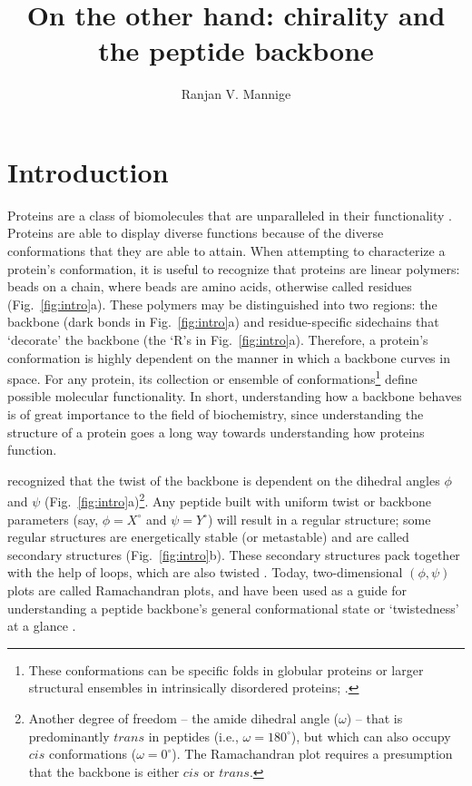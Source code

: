 \documentclass[fleqn,10pt]{wlpeerj} %
\title{On the other hand: chirality and the peptide backbone}
\author[1,*]{Ranjan V. Mannige}
\affil[1]{~Molecular Foundry, Lawrence Berkeley National Laboratory, Berkeley, CA, U.S.A.}
\affil[*]{~rvmannige@lbl.gov}
\newcommand{\Fig}[1]{Fig.~\ref{#1}}
\begin{document}
\flushbottom
\maketitle
\thispagestyle{empty}

\section*{Introduction}

Proteins are a class of biomolecules that are unparalleled in their functionality \citep{Berg2006}. 
Proteins are able to display diverse functions because of the diverse conformations that they are able to attain. 
When attempting to characterize a protein's conformation, it is useful to recognize that proteins are linear polymers:  beads on a chain, where beads are amino acids, otherwise called residues (\Fig{fig:intro}a). These polymers may be distinguished into two regions: the backbone (dark bonds in \Fig{fig:intro}a) and residue-specific sidechains that `decorate' the backbone (the `R's in \Fig{fig:intro}a). Therefore, a protein's conformation is highly dependent on the manner in which a backbone curves in space. For any protein, its collection or ensemble of conformations\footnote{These conformations can be specific folds in globular proteins or larger structural ensembles in intrinsically disordered proteins; \cite{Mannige2014b}.} define possible molecular functionality. 
In short, understanding how a backbone behaves is of great importance to the field of biochemistry, since understanding the structure of a protein goes a long way towards understanding how proteins function. 

\cite{Ramachandran1963} recognized that the twist of the backbone is dependent on the dihedral angles $\phi$ and $\psi$ (\Fig{fig:intro}a)\footnote{Another degree of freedom -- the amide dihedral angle ($\omega$) -- that is predominantly $trans$ in peptides (i.e., $\omega = 180^\circ$), but which can also occupy $cis$ conformations ($\omega = 0^\circ$). The Ramachandran plot requires a presumption that the backbone is either $cis$ or $trans$.}. 
Any peptide built with uniform twist or backbone parameters (say, $\phi=X^\circ$ and $\psi=Y^\circ$) will result in a regular structure; some regular structures are energetically stable (or metastable) and are called secondary structures (\Fig{fig:intro}b). These secondary structures pack together with the help of loops, which are also twisted \citep{Berg2006}. Today, two-dimensional $(\phi,\psi)$ plots are called Ramachandran plots, and have been used as a guide for understanding a peptide backbone's general conformational state or `twistedness' at a glance \citep{Ho2003,Berg2006,Alberts2002,Subramanian2001,Laskowski1993,Hooft1997,Laskowski2003}.
\end{document}
